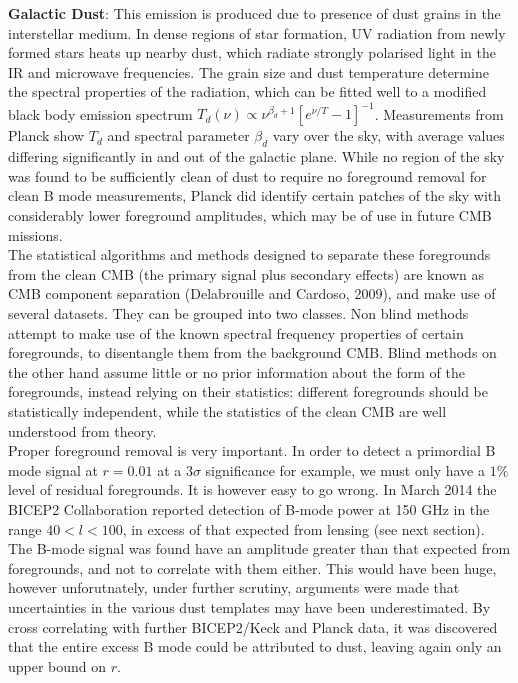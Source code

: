 \documentclass[a4paper,10pt]{article}
\begin{document}
\textbf{Galactic Dust}: This emission is produced due to presence of dust grains in the interstellar medium. In dense regions of star formation, UV radiation from newly formed stars heats up nearby dust, which radiate strongly polarised light in the IR and microwave frequencies. The grain size and dust temperature determine the spectral properties of the radiation, which can be fitted well to a modified black body emission spectrum $T_d(\nu) \propto \nu ^ {\beta_d+1}[e^{\nu/T}-1]^{-1}$. Measurements from Planck show $T_d$ and spectral parameter $\beta_d$ vary over the sky, with average values differing significantly in and out of the galactic plane. While no region of the sky was found to be sufficiently clean of dust to require no foreground removal for clean B mode measurements, Planck did identify certain patches of the sky with considerably lower foreground amplitudes, which may be of use in future CMB missions. \\

The statistical algorithms and methods designed to separate these foregrounds from the clean CMB (the primary signal plus secondary effects) are known as CMB component separation (Delabrouille and Cardoso, 2009), and make use of several datasets. They can be grouped into two classes. Non blind methods attempt to make use of the known spectral frequency properties of certain foregrounds, to disentangle them from the background CMB. Blind methods on the other hand assume little or no prior information about the form of the foregrounds, instead relying on their statistics: different foregrounds should be statistically independent, while the statistics of the clean CMB are well understood from theory.\\

Proper foreground removal is very important. In order to detect a primordial B mode signal at $r=0.01$ at a $3\sigma$ significance for example, we must only have a $1\%$ level of residual foregrounds. It is however easy to go wrong. In March 2014 the BICEP2 Collaboration reported detection of B-mode power at 150 GHz in the range $40<l<100$, in excess of that expected from lensing (see next section). The B-mode signal was found have an amplitude greater than that expected from foregrounds, and not to correlate with them either. This would have been huge, however unforutnately, under further scrutiny, arguments were made that uncertainties in the various dust templates may have been underestimated. By cross correlating with further BICEP2/Keck and Planck data, it was discovered that the entire excess B mode could be attributed to dust, leaving again only an upper bound on $r$.
\end{document}
